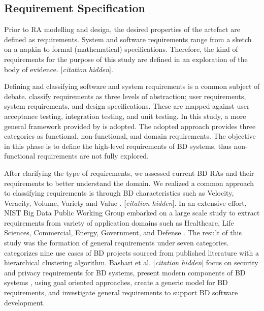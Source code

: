 \documentclass[a4paper,11pt]{article}
\let\cite\citep
\newcommand{\hc}{[\textit{citation hidden}]\textnormal{}}
\begin{document}
\subsection{Requirement Specification}
Prior to RA modelling and design, the desired properties of the artefact are defined as requirements. System and software requirements range from a sketch on a napkin to formal (mathematical) specifications. Therefore, the kind of requirements for the purpose of this study are defined in an exploration of the body of evidence. 
\hc.


Defining and classifying software and system requirements is a common subject of debate. \citet{sommerville2011software} classify requirements as three levels of abstraction; user requirements, system requirements, and design specifications. These are mapped against user acceptance testing, integration testing, and unit testing. In this study, a more general framework provided by \citet{laplante2017requirements} is adopted. The adopted approach provides three categories as functional, non-functional, and domain requirements. The objective in this phase is to define the high-level requirements of BD systems, thus non-functional requirements are not fully explored. 


After clarifying the type of requirements, we assessed current BD RAs and their requirements to better understand the domain. We realized a common approach to classifying requirements is through BD characteristics such as Velocity, Veracity, Volume, Variety and Value \cite{ataei2022state}.
\hc{}\cite{Bahrami2015,Chen2016a}.
 In an extensive effort, NIST Big Data Public Working Group embarked on a large scale study to extract requirements from variety of application domains such as Healthcare, Life Sciences, Commercial, Energy, Government, and Defense \cite{Chang}. The result of this study was the formation of general requirements under seven categories. \citet{volk2020identifying} categorizes nine use cases of BD projects sourced from published literature with a hierarchical clustering algorithm. Bashari et al. 
\hc{}
 focus on security and privacy requirements for BD systems, \citet{yu2019components} present modern components of BD systems , using goal oriented approaches, \citet{eridaputra2014modeling} create a generic model for BD requirements, and  \citet{al2016characteristics} investigate general requirements to support BD software development. 
\end{document}
